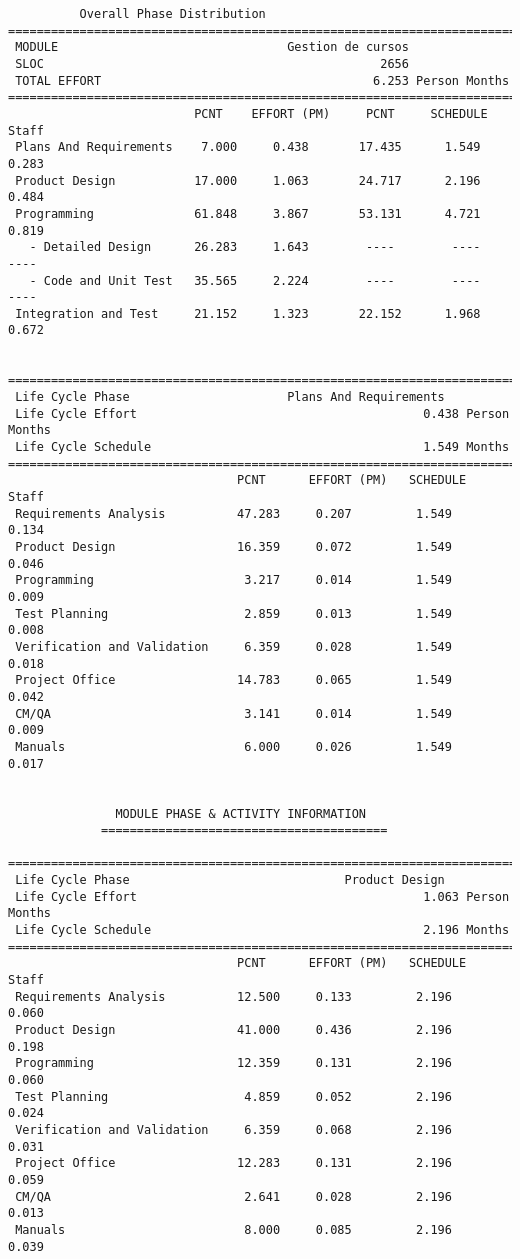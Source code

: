 \documentclass[11pt,a4paper,spanish,twoside]{report}
\begin{document}
{\begin{verbatim}
          Overall Phase Distribution
==============================================================================
 MODULE                                Gestion de cursos
 SLOC                                               2656
 TOTAL EFFORT                                      6.253 Person Months
==============================================================================
                          PCNT    EFFORT (PM)     PCNT     SCHEDULE       Staff
 Plans And Requirements    7.000     0.438       17.435      1.549       0.283
 Product Design           17.000     1.063       24.717      2.196       0.484
 Programming              61.848     3.867       53.131      4.721       0.819
   - Detailed Design      26.283     1.643        ----        ----        ----
   - Code and Unit Test   35.565     2.224        ----        ----        ----
 Integration and Test     21.152     1.323       22.152      1.968       0.672


==============================================================================
 Life Cycle Phase                      Plans And Requirements
 Life Cycle Effort                                        0.438 Person Months
 Life Cycle Schedule                                      1.549 Months
==============================================================================
                                PCNT      EFFORT (PM)   SCHEDULE       Staff   
 Requirements Analysis          47.283     0.207         1.549        0.134
 Product Design                 16.359     0.072         1.549        0.046
 Programming                     3.217     0.014         1.549        0.009
 Test Planning                   2.859     0.013         1.549        0.008
 Verification and Validation     6.359     0.028         1.549        0.018
 Project Office                 14.783     0.065         1.549        0.042
 CM/QA                           3.141     0.014         1.549        0.009
 Manuals                         6.000     0.026         1.549        0.017


		       MODULE PHASE & ACTIVITY INFORMATION
		     ========================================

==============================================================================
 Life Cycle Phase                              Product Design
 Life Cycle Effort                                        1.063 Person Months
 Life Cycle Schedule                                      2.196 Months
==============================================================================
                                PCNT      EFFORT (PM)   SCHEDULE       Staff   
 Requirements Analysis          12.500     0.133         2.196        0.060
 Product Design                 41.000     0.436         2.196        0.198
 Programming                    12.359     0.131         2.196        0.060
 Test Planning                   4.859     0.052         2.196        0.024
 Verification and Validation     6.359     0.068         2.196        0.031
 Project Office                 12.283     0.131         2.196        0.059
 CM/QA                           2.641     0.028         2.196        0.013
 Manuals                         8.000     0.085         2.196        0.039


\end{verbatim}}
\end{document}
